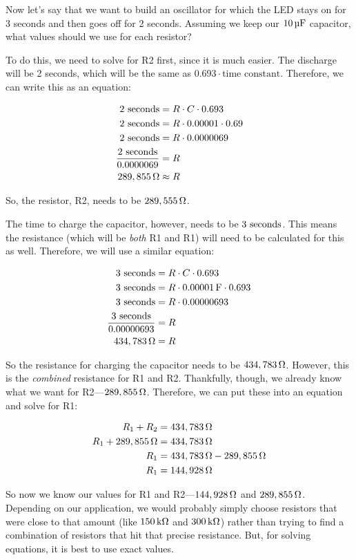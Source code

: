 \begin{exampleprob}
Now let's say that we want to build an oscillator for which the LED stays on for 3 seconds and then goes off for 2 seconds.
Assuming we keep our $10\,\si{\micro\farad}$ capacitor, what values should we use for each resistor?

To do this, we need to solve for R2 first, since it is much easier.
The discharge will be 2 seconds, which will be the same as $0.693 \cdot \textrm{time constant}$.
Therefore, we can write this as an equation:

\begin{align*}
2\textrm{ seconds} &= R\cdot C\cdot 0.693 \\
2\textrm{ seconds} &= R\cdot 0.00001 \cdot 0.69 \\
2\textrm{ seconds} &= R\cdot 0.0000069 \\
\frac{2\textrm{ seconds}}{0.0000069} &= R \\
289,855\,\si{\ohm} &\approx R
\end{align*}

So, the resistor, R2, needs to be $289,555\,\si{\ohm}$.

The time to charge the capacitor, however, needs to be $3\textrm{ seconds}$.
This means the resistance (which will be \emph{both} R1 and R1) will need to be calculated for this as well.
Therefore, we will use a similar equation:

\begin{align*}
3\textrm{ seconds} &= R\cdot C\cdot 0.693 \\
3\textrm{ seconds} &= R\cdot 0.00001\,\si{\farad} \cdot 0.693 \\
3\textrm{ seconds} &= R\cdot 0.00000693 \\
\frac{3\textrm{ seconds}}{0.00000693} &= R \\
434,783\,\si{\ohm} &= R
\end{align*}

So the resistance for charging the capacitor needs to be $434,783\,\si{\ohm}$.
However, this is the \emph{combined} resistance for R1 and R2.
Thankfully, though, we already know what we want for R2---$289,855\,\si{\ohm}$.
Therefore, we can put these into an equation and solve for R1:

\begin{align*}
R_1 + R_2 &= 434,783\,\si{\ohm} \\
R_1 + 289,855\,\si{\ohm} &= 434,783\,\si{\ohm} \\
R_1 &= 434,783\,\si{\ohm} - 289,855\,\si{\ohm} \\
R_1 &= 144,928\,\si{\ohm}
\end{align*}

So now we know our values for R1 and R2---$144,928\,\si{\ohm}$ and $289,855\,\si{\ohm}$.
Depending on our application, we would probably simply choose resistors that were close to that amount (like $150\,\si{\kilo\ohm}$ and $300\,\si{\kilo\ohm}$) rather than trying to find a combination of resistors that hit that precise resistance.
But, for solving equations, it is best to use exact values.
\end{exampleprob}

